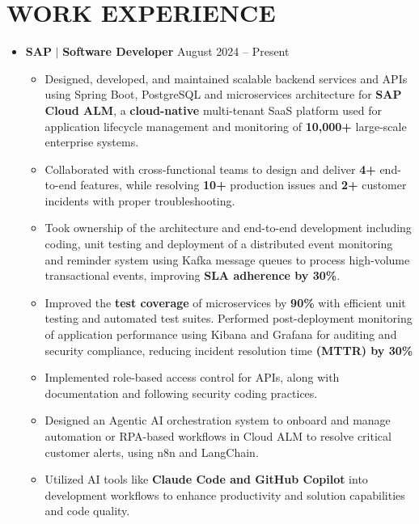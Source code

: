 \documentclass[a4paper,11pt]{article}
\begin{document}
 
\section{WORK EXPERIENCE}
\begin{itemize}[leftmargin=0in, label={}]
  \item
    \textbf{SAP }$|$\textbf{ Software Developer} \hfill \small{August 2024 -- Present} \\
    \begin{itemize}[leftmargin=0.18in, itemsep=0.5pt, topsep=1pt]
      \item \small{Designed, developed, and maintained scalable backend services and APIs using Spring Boot, PostgreSQL and microservices architecture for \textbf{SAP Cloud ALM}, a \textbf{cloud-native} multi-tenant SaaS platform used for application lifecycle management and monitoring of \textbf{10,000+} large-scale enterprise systems.}
      \item \small{Collaborated with cross-functional teams to design and deliver \textbf{4+} end-to-end features, while resolving \textbf{10+} production issues and \textbf{2+} customer incidents with proper troubleshooting.}
      \item \small{Took ownership of the architecture and end-to-end development including coding, unit testing and deployment of a distributed event monitoring and reminder system using Kafka message queues to process high-volume transactional events, improving \textbf{SLA adherence by 30\%}.}
      \item \small{Improved the \textbf{test coverage} of microservices by \textbf{90\%} with efficient unit testing and automated test suites. Performed post-deployment monitoring of application performance using Kibana and Grafana for auditing and security compliance, reducing incident resolution time \textbf{(MTTR) by 30\%}}
      \item \small{Implemented role-based access control for APIs, along with documentation and following security coding practices.}
      \item \small{Designed an Agentic AI orchestration system to onboard and manage automation or RPA-based workflows in Cloud ALM to resolve critical customer alerts, using n8n and LangChain.}
      \item \small{Utilized AI tools like \textbf{Claude Code and GitHub Copilot} into development workflows to enhance productivity and solution capabilities and code quality.}
    \end{itemize}
\end{itemize}
\end{document}
